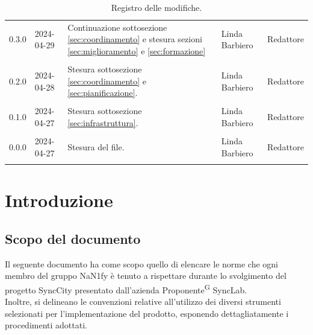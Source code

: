 \documentclass[8pt]{article}
\newcommand{\glossterm}[1]{#1\textsuperscript{G}} %
\begin{document}
\begin{table}[ht!]
\begin{tabular}{p{1.2cm} p{2cm} p{6cm} p{3cm} p{2cm}}
		0.3.0 & 2024-04-29 & Continuazione sottosezione \ref{sec:coordinamento} e
      stesura sezioni \ref{sec:miglioramento} e \ref{sec:formazione} & Linda Barbiero & Redattore \\\\ %
      0.2.0 & 2024-04-28 & Stesura sottosezione \ref{sec:coordinamento} e \ref{sec:pianificazione}. & Linda Barbiero & Redattore \\\\ %
      0.1.0 & 2024-04-27 & Stesura sottosezione \ref{sec:infrastruttura}. & Linda Barbiero & Redattore \\\\ %
		0.0.0 & 2024-04-27 & Stesura del file. & Linda Barbiero & Redattore \\\\ %
		\bottomrule
	\end{tabular}
	\caption{Registro delle modifiche.}
	\label{table:Registro delle modifiche}
\end{table}
\newpage
{\hypersetup{hidelinks} \tableofcontents}
\clearpage
\newpage
{\hypersetup{hidelinks} \listoffigures}
\newpage
{\hypersetup{hidelinks} \listoftables}
\newpage
\justifying
\section{Introduzione} \label{sec:intro}
\subsection{Scopo del documento}
Il seguente documento ha come scopo quello di elencare le norme che ogni membro del gruppo NaN1fy è
tenuto a rispettare durante lo svolgimento del progetto SyncCity presentato dall'azienda
\glossterm{Proponente} SyncLab.\\
Inoltre, si delineano le convenzioni relative all'utilizzo dei diversi strumenti selezionati per l'implementazione del prodotto, esponendo dettagliatamente i procedimenti adottati.
\end{document}
